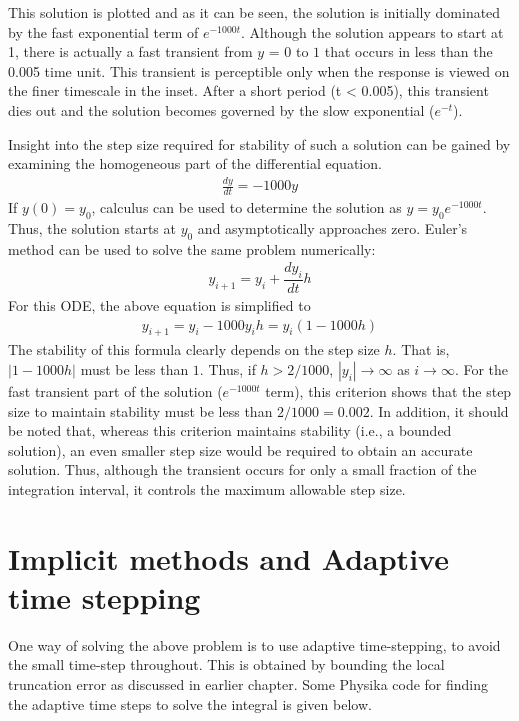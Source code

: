\documentclass[book.tex]{subfiles}
\begin{document}
This solution is plotted and as it can be seen, the solution is initially dominated by the fast exponential term of $e^{-1000t}$. Although the solution appears to start at 1, there is actually a fast transient from $y$ = $0$ to $1$ that occurs in less than the 0.005 time unit. This transient is perceptible only when the response is viewed on the finer timescale in the inset. After a short period (t < 0.005), this transient dies out and the solution becomes governed by the slow exponential ($e^{-t}$). 

Insight into the step size required for stability of such a solution can be gained by examining the homogeneous part of the differential equation.
\begin{align}
\frac{dy}{dt} = -1000y
\end{align}
If $y(0)=y_0$, calculus can be used to determine the solution as $y = y_0e^{-1000t}$. Thus, the solution starts at $y_0$ and asymptotically approaches zero. Euler's method can be used to solve the same problem numerically:
\begin{align}
y_{i+1} = y_i + \dfrac{dy_i}{dt}h
\end{align}
For this ODE, the above equation is simplified to
\begin{align}
y_{i+1} = y_i -1000y_ih = y_i(1-1000h)
\end{align}
The stability of this formula clearly depends on the step size $h$.	That is, $|1-1000h|$ must be less than $1$. Thus, if $h>2/1000$, $|y_i| \rightarrow \infty$ as $i \rightarrow \infty$. For the fast transient part of the solution ($e^{-1000t}$ term), this criterion shows that the step size to maintain stability must be less than $2/1000 = 0.002$. In addition, it should be noted that, whereas this criterion maintains stability (i.e., a bounded solution), an even smaller step size would be required to obtain an accurate solution. Thus, although the transient occurs for only a small fraction of the integration interval, it controls the maximum allowable step size.


\section{Implicit methods and Adaptive time stepping}

One way of solving the above problem is to use adaptive time-stepping, to avoid the small time-step throughout. This is obtained by bounding the local truncation error as discussed in earlier chapter. Some Physika code for finding the adaptive time steps to solve the integral is given below.
\end{document}
